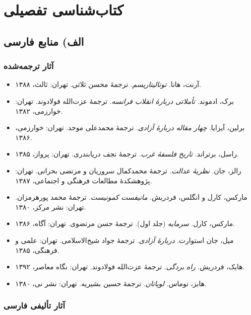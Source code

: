 \chapter*{کتاب‌شناسی تفصیلی}

\section*{الف) منابع فارسی}

\subsection*{آثار ترجمه‌شده}

\begin{itemize}[rightmargin=2cm]
    \item آرنت، هانا. \textit{توتالیتاریسم}. ترجمهٔ محسن ثلاثی. تهران: ثالث، ۱۳۸۸.
    \item برک، ادموند. \textit{تأملاتی دربارهٔ انقلاب فرانسه}. ترجمهٔ عزت‌الله فولادوند. تهران: خوارزمی، ۱۳۸۲.
    \item برلین، آیزایا. \textit{چهار مقاله دربارهٔ آزادی}. ترجمهٔ محمدعلی موحد. تهران: خوارزمی، ۱۳۸۶.
    \item راسل، برتراند. \textit{تاریخ فلسفهٔ غرب}. ترجمهٔ نجف دریابندری. تهران: پرواز، ۱۳۸۵.
    \item رالز، جان. \textit{نظریهٔ عدالت}. ترجمهٔ محمدکمال سروریان و مرتضی بحرانی. تهران: پژوهشکدهٔ مطالعات فرهنگی و اجتماعی، ۱۳۸۷.
    \item مارکس، کارل و انگلس، فردریش. \textit{مانیفست کمونیست}. ترجمهٔ محمد پورهرمزان. تهران: نشر مرکز، ۱۳۸۰.
    \item مارکس، کارل. \textit{سرمایه} (جلد اول). ترجمهٔ حسن مرتضوی. تهران: آگاه، ۱۳۸۶.
    \item میل، جان استوارت. \textit{دربارهٔ آزادی}. ترجمهٔ جواد شیخ‌الاسلامی. تهران: علمی و فرهنگی، ۱۳۸۵.
    \item هایک، فردریش. \textit{راه بردگی}. ترجمهٔ عزت‌الله فولادوند. تهران: نگاه معاصر، ۱۳۹۲.
    \item هابز، توماس. \textit{لویاتان}. ترجمهٔ حسین بشیریه. تهران: نشر نی، ۱۳۸۰.
\end{itemize}

\subsection*{آثار تألیفی فارسی}

